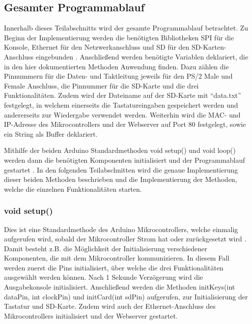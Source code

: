 \subsection{Gesamter Programmablauf}
Innerhalb dieses Teilabschnitts wird der gesamte Programmablauf betrachtet. Zu Beginn der Implementierung werden die benötigten Bibliotheken SPI für die Konsole, Ethernet für den Netzwerkanschluss und SD für den SD-Karten-Anschluss eingebunden \cite{arduino_libraries}. Anschließend werden benötigte Variablen deklariert, die in den hier dokumentierten Methoden Anwendung finden. Dazu zählen die Pinnummern für die Daten- und Taktleitung jeweils für den PS/2 Male und Female Anschluss, die Pinnummer für die SD-Karte und die drei Funktionalitäten. Zudem wird der Dateiname auf der SD-Karte mit ``data.txt'' festgelegt, in welchem einerseits die Tastatureingaben gespeichert werden und andererseits zur Wiedergabe verwendet werden. Weiterhin wird die MAC- und IP-Adresse des Mikrocontrollers und der Webserver auf Port 80 festgelegt, sowie ein String als Buffer deklariert.

Mithilfe der beiden Arduino Standardmethoden void setup() und void loop() werden dann die benötigten Komponenten initialisiert und der Programmablauf gestartet \cite{arduino_language}. In den folgenden Teilabschnitten wird die genaue Implementierung dieser beiden Methoden beschrieben und die Implementierung der Methoden, welche die einzelnen Funktionalitäten starten.

\subsubsection{void setup()}
Dies ist eine Standardmethode des Arduino Mikrocontrollers, welche einmalig aufgerufen wird, sobald der Mikrocontroller Strom hat oder zurückgesetzt wird \cite{arduino_language}. Damit besteht z.B. die Möglichkeit der Initialisierung verschiedener Komponenten, die mit dem Mikrocontroller kommunizieren. In diesem Fall werden zuerst die Pins initialisiert, über welche die drei Funktionalitäten ausgewählt werden können. Nach 1 Sekunde Verzögerung wird die Ausgabekonsole initialisiert. Anschließend werden die Methoden initKeys(int dataPin, int clockPin) und initCard(int sdPin) aufgerufen, zur Initialisierung der Tastatur und SD-Karte. Zudem wird auch der Ethernet-Anschluss des Mikrocontrollers initialisiert und der Webserver gestartet.


